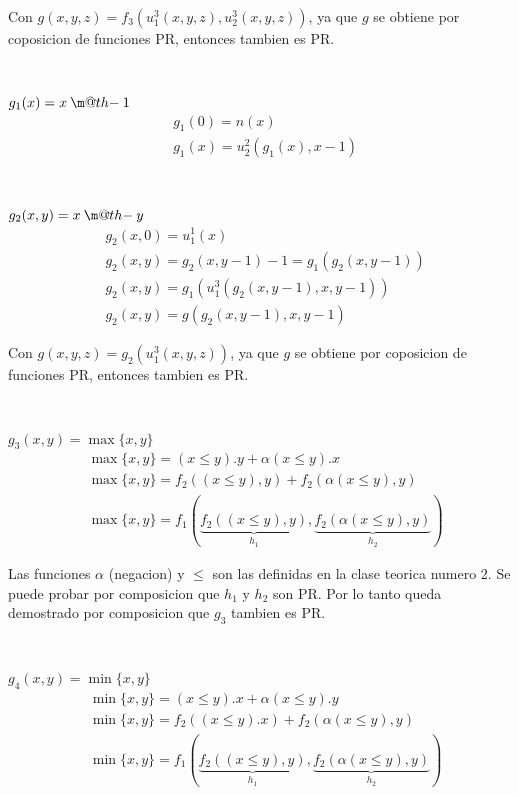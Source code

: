 \documentclass{report}
\makeatletter
\newcommand{\dotminus}{\mathbin{\text{\@dotminus}}}
\newcommand{\@dotminus}{%
  \ooalign{\hidewidth\raise1ex\hbox{.}\hidewidth\cr$\m@th-$\cr}%
}
\makeatother
\begin{document}
Con $g(x,y,z) = f_3(u_1^3(x,y,z),u_2^3(x,y,z))$, ya que $g$ se obtiene por coposicion de funciones PR, entonces tambien es PR.

~

\sol
$g_1(x)=x \dotminus 1$
\begin{align*}
	 & g_{1}(0)=n(x) \\&g_{1}(x)=u_{2}^{2}(g_{1}(x),x-1)
\end{align*}

~

\sol
$g_2(x,y)=x \dotminus y$
\begin{align*}
	 & g_{2}(x,0)=u_{1}^{1}(x)                         \\
	 & g_{2}(x,y)=g_{2}(x,y-1)-1=g_{1}(g_{2}(x,y-1))   \\
	 & g_{2}(x,y)=g_{1}(u_{1}^{3}(g_{2}(x,y-1),x,y-1)) \\
	 & g_{2}(x,y)=g(g_{2}(x,y-1),x,y-1)
\end{align*}

Con $g(x,y,z) = g_2(u_1^3(x,y,z))$, ya que $g$ se obtiene por coposicion de funciones PR, entonces tambien es PR.

~

\sol
$g_3(x,y)=\max\{x,y\}$
\begin{align*}
	 & \max\{x,y\}=(x\leqslant y).y+\alpha(x\leqslant y).x                                                                \\
	 & \max\{x,y\}=f_{2}((x\leqslant y),y)+f_{2}(\alpha(x\leqslant y),y)                                                  \\
	 & \max\{x,y\}=f_{1}(\underbrace{f_{2}((x\leqslant y),y)}_{h_{1}},\underbrace{f_{2}(\alpha(x\leqslant y),y)}_{h_{2}})
\end{align*}

Las funciones $\alpha$ (negacion) y $\leq$ son las definidas en la clase teorica numero 2.
Se puede probar por composicion que $h_1$ y $h_2$ son PR. Por lo tanto queda demostrado por composicion que $g_3$ tambien es PR.

~

\sol
$g_4(x,y)=\min\{x,y\}$
\begin{align*}
	 & \min\{x,y\}=(x\leqslant y).x+\alpha(x\leqslant y).y                                                                \\
	 & \min\{x,y\}=f_{2}((x\leqslant y).x)+f_{2}(\alpha(x\leqslant y),y)                                                  \\
	 & \min\{x,y\}=f_{1}(\underbrace{f_{2}((x\leqslant y),y)}_{h_{1}},\underbrace{f_{2}(\alpha(x\leqslant y),y)}_{h_{2}})
\end{align*}
\end{document}
